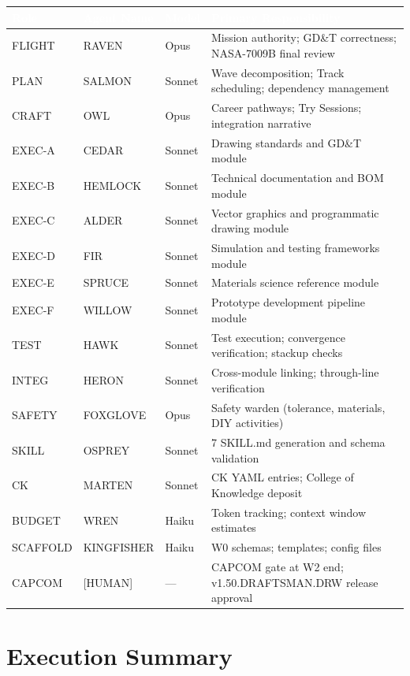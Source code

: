 \documentclass[11pt,letterpaper]{article}
\newcommand{\tableheader}[1]{\textbf{\sffamily\textcolor{white}{#1}}}
\begin{document}
\begin{center}
\begin{tabularx}{\textwidth}{L{2cm}L{2.8cm}C{1.5cm}X}
\toprule
{}
\tableheader{Role} & \tableheader{Agent Name} & \tableheader{Model} & \tableheader{Primary Responsibility} \\
\midrule
FLIGHT & RAVEN & Opus & Mission authority; GD\&T correctness; NASA-7009B final review \\
PLAN & SALMON & Sonnet & Wave decomposition; Track scheduling; dependency management \\
CRAFT & OWL & Opus & Career pathways; Try Sessions; integration narrative \\
EXEC-A & CEDAR & Sonnet & Drawing standards and GD\&T module \\
EXEC-B & HEMLOCK & Sonnet & Technical documentation and BOM module \\
EXEC-C & ALDER & Sonnet & Vector graphics and programmatic drawing module \\
EXEC-D & FIR & Sonnet & Simulation and testing frameworks module \\
EXEC-E & SPRUCE & Sonnet & Materials science reference module \\
EXEC-F & WILLOW & Sonnet & Prototype development pipeline module \\
TEST & HAWK & Sonnet & Test execution; convergence verification; stackup checks \\
INTEG & HERON & Sonnet & Cross-module linking; through-line verification \\
SAFETY & FOXGLOVE & Opus & Safety warden (tolerance, materials, DIY activities) \\
SKILL & OSPREY & Sonnet & 7 SKILL.md generation and schema validation \\
CK & MARTEN & Sonnet & CK YAML entries; College of Knowledge deposit \\
BUDGET & WREN & Haiku & Token tracking; context window estimates \\
SCAFFOLD & KINGFISHER & Haiku & W0 schemas; templates; config files \\
CAPCOM & [HUMAN] & --- & CAPCOM gate at W2 end; v1.50.DRAFTSMAN.DRW release approval \\
\bottomrule
\end{tabularx}
\end{center}

\section{Execution Summary}
\end{document}

